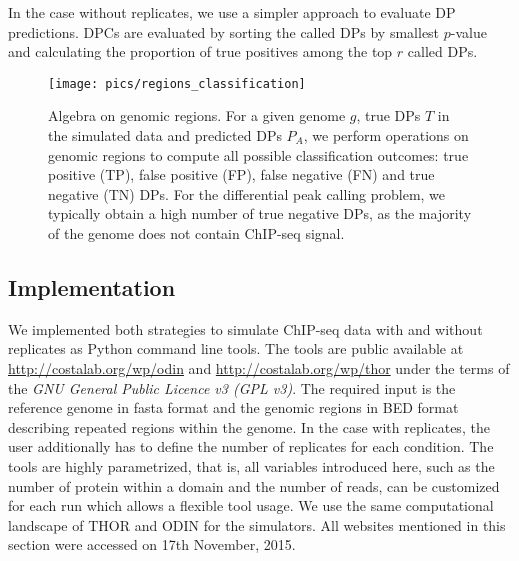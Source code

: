 In the case without replicates, we use a simpler approach to evaluate DP predictions.
DPCs are evaluated by sorting the called DPs by smallest $p$-value and calculating the proportion of true positives among the top $r$ called DPs. 


\begin{figure}[H]
\begin{center}
 \texttt{[image: pics/regions\_classification]}
\end{center}
\caption[Algebra on genomic regions]{Algebra on genomic regions.
For a given genome $g$, true DPs $T$ in the simulated data and predicted DPs $P_A$, we perform operations on genomic regions to compute all possible classification outcomes: true positive (TP), false positive (FP), false negative (FN) and true negative (TN) DPs.
For the differential peak calling problem, we typically obtain a high number of true negative DPs, as the majority of the genome does not contain ChIP-seq signal.}
\label{pic_region_classification}
\end{figure}

\subsection{Implementation}
We implemented both strategies to simulate ChIP-seq data with and without replicates as Python command line tools.
The tools are public available at \url{http://costalab.org/wp/odin} and \url{http://costalab.org/wp/thor} under the terms of the \textit{GNU General Public Licence v3 (GPL v3)}.
The required input is the reference genome in fasta format and the genomic regions in BED format describing repeated regions within the genome.
In the case with replicates, the user additionally has to define the number of replicates for each condition.
The tools are highly parametrized, that is, all variables introduced here, such as the number of protein within a domain and the number of reads, can be customized for each run which allows a flexible tool usage.
We use the same computational landscape of THOR and ODIN for the simulators.
\noindent
All websites mentioned in this section were accessed on 17th November, 2015.

